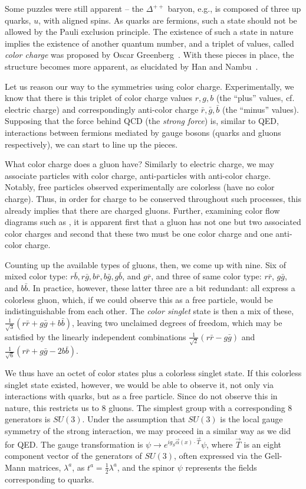 Some puzzles were still apparent -- the $\Delta^{++}$ baryon, e.g., is composed of three up quarks, 
$u$, with aligned spins. As quarks are fermions, such a state should not be allowed by the Pauli exclusion 
principle. The existence of such a state in nature implies the existence of another quantum number, and 
a triplet of values, called \emph{color charge} was proposed by Oscar Greenberg~\cite{Greenberg}. With these
pieces in place, the structure becomes more apparent, as elucidated by Han and Nambu~\cite{Han-Nambu}.

Let us reason our way to the symmetries using color charge. Experimentally, we know that there is this triplet
of color charge values $r, g, b$ (the ``plus'' values, cf. electric charge) and correspondingly anti-color charge
$\bar{r}, \bar{g}, \bar{b}$ (the ``minus'' values). Supposing that the force behind QCD (the \emph{strong force}) is, 
similar to QED, interactions between fermions mediated by gauge bosons (quarks and gluons respectively), we can 
start to line up the pieces.

What color charge does a gluon have? Similarly to electric charge, we may associate particles
with color charge, anti-particles with anti-color charge. Notably, free particles observed experimentally are 
colorless (have no color charge). Thus, in order for charge to be conserved throughout such 
processes, this already implies that there are charged gluons. Further, examining color flow diagrams 
such as , it is apparent first that a gluon has not one but two associated color charges
and second that these two must be one color charge and one anti-color charge.

Counting up the available types of gluons, then, we come up with nine. Six of mixed color type: 
$r\bar{b}, r\bar{g}, b\bar{r}, b\bar{g}, g\bar{b}$, and $g\bar{r}$, and three of same color type:
$r\bar{r}$, $g\bar{g}$, and $b\bar{b}$. In practice, however, these latter three are a bit redundant:
all express a colorless gluon, which, if we could observe this as a free particle, would be indistinguishable
from each other. The \emph{color singlet} state is then a mix of these, $\frac{1}{\sqrt{3}}(r\bar{r}+g\bar{g}+b\bar{b})$,
leaving two unclaimed degrees of freedom, which may be satisfied by the linearly independent combinations
$\frac{1}{\sqrt{2}}(r\bar{r}-g\bar{g})$ and $\frac{1}{\sqrt{6}}(r\bar{r}+g\bar{g}-2b\bar{b})$.

We thus have an octet of color states plus a colorless singlet state. If this colorless singlet state 
existed, however, we would be able to observe it, not only via interactions with quarks, but as a free
particle. Since do not observe this in nature, this restricts us to $8$ gluons. The simplest group with 
a corresponding 8 generators is $SU(3)$. Under the assumption that $SU(3)$ is the local gauge symmetry
of the strong interaction, we may proceed in a similar way as we did for QED. The gauge transformation is 
$\psi \rightarrow e^{ig_{S}\vec{\alpha}(x)\cdot \vec{T}}\psi$, where $\vec{T}$ is an eight component vector
of the generators of $SU(3)$, often expressed via the Gell-Mann matrices, $\lambda^{a}$, as $t^{a} = \frac{1}{2}\lambda^{a}$,
and the spinor $\psi$ represents the fields corresponding to quarks.

